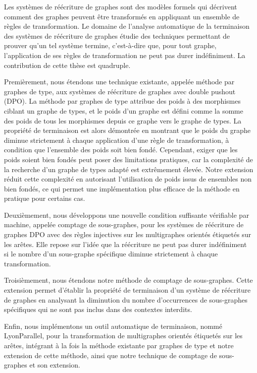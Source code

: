 Les systèmes de réécriture de graphes sont des modèles formels qui décrivent comment des graphes peuvent être transformés en appliquant un ensemble de règles de transformation. Le domaine de l'analyse automatique de la terminaison des systèmes de réécriture de graphes étudie des techniques permettant de prouver qu'un tel système termine, c'est-à-dire que, pour tout graphe, l'application de ses règles de transformation ne peut pas durer indéfiniment. La contribution de cette thèse est quadruple.

Premièrement, nous étendons une technique existante, appelée méthode par graphes de type, aux systèmes de réécriture de graphes avec double pushout (DPO). La méthode par graphes de type attribue des poids à des morphismes ciblant un graphe de types, et le poids d'un graphe est défini comme la somme des poids de tous les morphismes depuis ce graphe vers le graphe de types. La propriété de terminaison est alors démontrée en montrant que le poids du graphe diminue strictement à chaque application d'une règle de transformation, à condition que l'ensemble des poids soit bien fondé. Cependant, exiger que les poids soient bien fondés peut poser des limitations pratiques, car la complexité de la recherche d'un graphe de types adapté est extrêmement élevée. Notre extension réduit cette complexité en autorisant l'utilisation de poids issus de ensembles non bien fondés, ce qui permet une implémentation plus efficace de la méthode en pratique pour certains cas.

Deuxièmement, nous développons une nouvelle condition suffisante vérifiable par machine, appelée comptage de sous-graphes, pour les systèmes de réécriture de graphes DPO avec des règles injectives sur les multigraphes orientés étiquetés sur les arêtes. Elle repose sur l'idée que la réécriture ne peut pas durer indéfiniment si le nombre d'un sous-graphe spécifique diminue strictement à chaque transformation.

Troisièmement, nous étendons notre méthode de comptage de sous-graphes. Cette extension permet d'établir la propriété de terminaison d'un système de réécriture de graphes en analysant la diminution du nombre d'occurrences de sous-graphes spécifiques qui ne sont pas inclus dans des contextes interdits.

Enfin, nous implémentons un outil automatique de terminaison, nommé LyonParallel, pour la transformation de multigraphes orientés étiquetés sur les arêtes, intégrant à la fois la méthode existante par graphes de type et notre extension de cette méthode, ainsi que notre technique de comptage de sous-graphes et son extension.